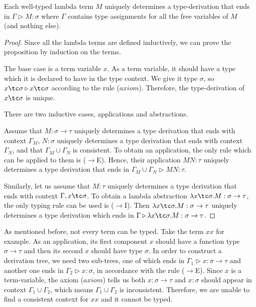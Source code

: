 \begin{proposition}
\label{proposition:unique_derivation}
Each well-typed lambda term $M$ uniquely determines a type-derivation that ends in $ \Gamma \triangleright M : \sigma $ where $ \Gamma $ contains type assignments for all the free variables of $M$ (and nothing else). \footnotemark
\end{proposition}
\begin{proof}\mbox\\

Since all the lambda terms are defined inductively, we can prove the proposition by induction on the terms.

The base case is a term variable $ x $. As a term variable, it should have a type which it is declared to have in the type context. We give it type $ \sigma $, so $ x \tc \sigma \triangleright x \tc \sigma $ according to the rule ($axiom$). Therefore, the type-derivation of $ x \tc \sigma $ is unique.

There are two inductive cases, applications and abstractions.

Assume that $ M: \sigma \to \tau $ uniquely determines a type derivation that ends with context $ \Gamma_M $, $ N: \sigma $ uniquely determines a type derivation that ends with context $ \Gamma_N $, and that $ \Gamma_M \cup \Gamma_N $ is consistent. To obtain an application, the only rule which can be applied to them is ($ \to $E). Hence, their application $ MN: \tau $ uniquely determines a type derivation that ends in $ \Gamma_M \cup \Gamma_N \triangleright MN: \tau $.

Similarly, let us assume that $ M: \tau $ uniquely determines a type derivation that ends with context $ \Gamma, x \tc \sigma $. To obtain a lambda abstraction $ \lambda x \tc \sigma . M: \sigma \to \tau $, the only typing rule can be used is ($ \to $I). Then $ \lambda x \tc \sigma . M: \sigma \to \tau $ uniquely determines a type derivation which ends in $ \Gamma \triangleright \lambda x \tc \sigma . M: \sigma \to \tau $.

\end{proof}

As mentioned before, not every term can be typed. Take the term $ x x $ for example. As an application, its first component $ x $ should have a function type $ \sigma \to \tau $ and then its second $ x $ should have type $ \sigma $. In order to construct a derivation tree, we need two sub-trees, one of which ends in $ \Gamma_1 \triangleright x: \sigma \to \tau $ and another one ends in $ \Gamma_2 \triangleright x : \sigma $, in accordance with the rule ($ \to $E). Since $ x $ is a term-variable, the axiom ($ axiom $) tells us both $ x : \sigma \to \tau $ and $ x: \sigma $ should appear in context $ \Gamma_1 \cup \Gamma_2 $, which means $ \Gamma_1 \cup \Gamma_2 $ is inconsistent. Therefore, we are unable to find a consistent context for $ x x $ and it cannot be typed.


